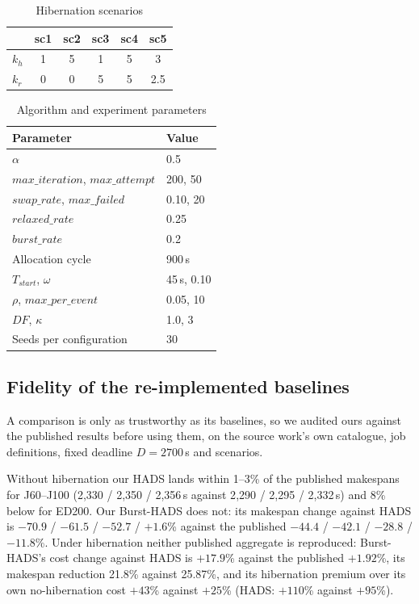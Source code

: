 \documentclass[conference]{IEEEtran}
\begin{document}
\begin{table}[t]
\caption{Hibernation scenarios}
\label{tab:scenarios}
\centering
\footnotesize
\begin{tabular}{lccccc}
\toprule
 & sc1 & sc2 & sc3 & sc4 & sc5 \\
\midrule
$k_h$ & 1 & 5 & 1 & 5 & 3 \\
$k_r$ & 0 & 0 & 5 & 5 & 2.5 \\
\bottomrule
\end{tabular}
\end{table}

\begin{table}[t]
\caption{Algorithm and experiment parameters}
\label{tab:params}
\centering
\footnotesize
\begin{tabular}{ll}
\toprule
Parameter & Value \\
\midrule
$\alpha$ & 0.5 \\
$\mathit{max\_iteration}$, $\mathit{max\_attempt}$ & 200, 50 \\
$\mathit{swap\_rate}$, $\mathit{max\_failed}$ & 0.10, 20 \\
$\mathit{relaxed\_rate}$ & 0.25 \\
$\mathit{burst\_rate}$ & 0.2 \\
Allocation cycle & 900\,s \\
$T_{\mathit{start}}$, $\omega$ & 45\,s, 0.10 \\
$\rho$, $\mathit{max\_per\_event}$ & 0.05, 10 \\
$\mathit{DF}$, $\kappa$ & 1.0, 3 \\
Seeds per configuration & 30 \\
\bottomrule
\end{tabular}
\end{table}

\subsection{Fidelity of the re-implemented baselines}
\label{sec:validation}

A comparison is only as trustworthy as its baselines, so we audited ours
against the published results before using them, on the source work's own
catalogue, job definitions, fixed deadline $D = 2700$\,s and scenarios.

Without hibernation our HADS lands within 1--3\% of the published makespans for
J60--J100 (2{,}330 / 2{,}350 / 2{,}356\,s against 2{,}290 / 2{,}295 /
2{,}332\,s) and 8\% below for ED200. Our Burst-HADS does not: its makespan
change against HADS is $-70.9$ / $-61.5$ / $-52.7$ / $+1.6$\% against the
published $-44.4$ / $-42.1$ / $-28.8$ / $-11.8$\%. Under hibernation neither
published aggregate is reproduced: Burst-HADS's cost change against HADS is
$+17.9$\% against the published $+1.92$\%, its makespan reduction 21.8\%
against 25.87\%, and its hibernation premium over its own no-hibernation cost
$+43$\% against $+25$\% (HADS: $+110$\% against $+95$\%).
\end{document}
